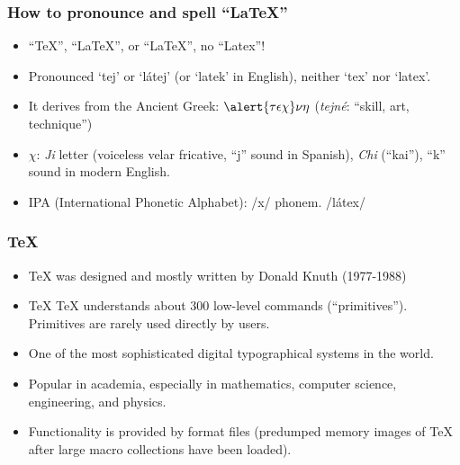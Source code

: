 \documentclass{beamer}
\begin{document}
\begin{frame}
\frametitle{How to pronounce and spell ``LaTeX''}

\begin{itemize}

\item ``\TeX'', ``\LaTeX'', or ``LaTeX'', no ``Latex''!
\item Pronounced `tej' or `látej' (or `latek' in English), neither `tex' nor `latex'. 
\item It derives from the Ancient Greek: $\alert{\tau\epsilon\chi}\nu\eta$ (\textit{\alert{tej}né}: ``skill, art, technique'')
\item $\chi$: \textit{Ji} letter (voiceless velar fricative, ``j'' sound in Spanish), \textit{Chi} (``kai''), ``k'' sound in modern English.
\item IPA (International Phonetic Alphabet): /x/ phonem. /látex/ 
\end{itemize}

\end{frame}


\begin{frame}
\frametitle{\TeX}

\begin{itemize}

\item \TeX{} was designed and mostly written by Donald Knuth (1977-1988)
\item \TeX{} \TeX{} understands about 300 low-level commands (``primitives''). Primitives are rarely used directly by users.
\item One of the most sophisticated digital typographical systems in the world.
\item Popular in academia, especially in mathematics, computer science, engineering, and physics. 
\item Functionality is provided by \alert{format files} (predumped memory images of \TeX{} after large macro collections have been loaded).

\end{itemize}

\end{frame}

\end{document}
